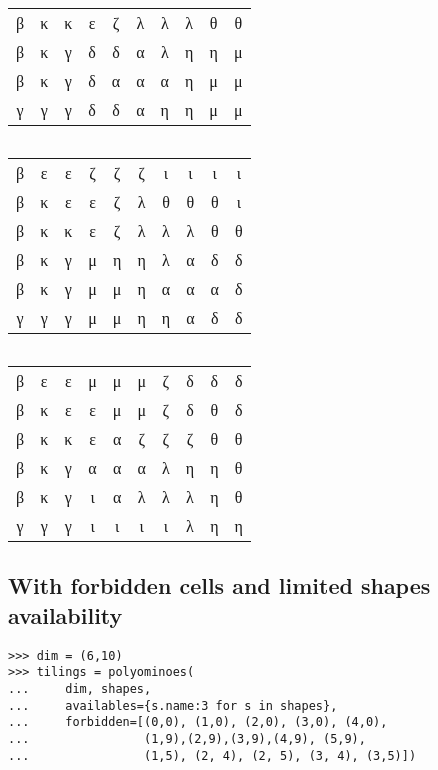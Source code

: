 \begin{margintable}[-5cm]
{\begin{tabular}{|cccccccccc|}
β & κ & κ & ε & ζ & λ & λ & λ & θ & θ \\
β & κ & γ & δ & δ & α & λ & η & η & μ \\
β & κ & γ & δ & α & α & α & η & μ & μ \\
γ & γ & γ & δ & δ & α & η & η & μ & μ \\
\hline
\end{tabular}
$\quad$\\
$\quad$\\
\begin{tabular}{|cccccccccc|}
\hline
β & ε & ε & ζ & ζ & ζ & ι & ι & ι & ι \\
β & κ & ε & ε & ζ & λ & θ & θ & θ & ι \\
β & κ & κ & ε & ζ & λ & λ & λ & θ & θ \\
β & κ & γ & μ & η & η & λ & α & δ & δ \\
β & κ & γ & μ & μ & η & α & α & α & δ \\
γ & γ & γ & μ & μ & η & η & α & δ & δ \\
\hline
\end{tabular}
$\quad$\\
$\quad$\\
\begin{tabular}{|cccccccccc|}
\hline
β & ε & ε & μ & μ & μ & ζ & δ & δ & δ \\
β & κ & ε & ε & μ & μ & ζ & δ & θ & δ \\
β & κ & κ & ε & α & ζ & ζ & ζ & θ & θ \\
β & κ & γ & α & α & α & λ & η & η & θ \\
β & κ & γ & ι & α & λ & λ & λ & η & θ \\
γ & γ & γ & ι & ι & ι & ι & λ & η & η \\
\hline
\end{tabular}
}
\end{margintable}

\newpage
\subsection{With forbidden cells and limited shapes availability}

\begin{verbatim}
>>> dim = (6,10)
>>> tilings = polyominoes(
...     dim, shapes,
...     availables={s.name:3 for s in shapes},
...     forbidden=[(0,0), (1,0), (2,0), (3,0), (4,0),
...                (1,9),(2,9),(3,9),(4,9), (5,9),
...                (1,5), (2, 4), (2, 5), (3, 4), (3,5)])
\end{verbatim}

